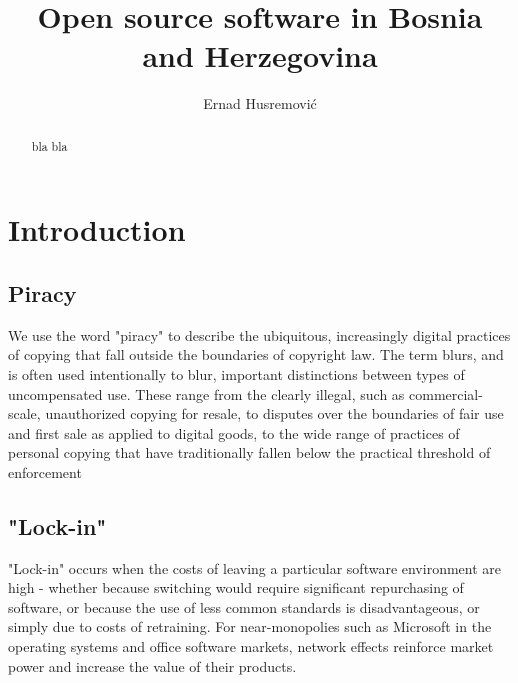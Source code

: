 \documentclass[times, utf8, seminar]{fit}
\begin{document}
\title{Open source software in Bosnia and Herzegovina}

\author{Ernad Husremović}


\maketitle

\tableofcontents

\listoftables
\listoffigures

\begin{abstract}

bla bla 

\end{abstract}


\chapter{Introduction}

\section{Piracy}

We use the word "piracy" to describe the ubiquitous, increasingly digital practices of copying that fall outside the boundaries of copyright law. The term blurs, and is often used intentionally to blur, important distinctions between types of uncompensated use. These range from the clearly illegal, such as commercial-scale, unauthorized copying for resale, to disputes over the boundaries of fair use and first sale as applied to digital goods, to the wide range of practices of personal copying that have traditionally fallen below the practical threshold of enforcement\citep{mediapiracy}


\section{"Lock-in"}

"Lock-in" occurs when the costs of leaving a particular software environment are high - whether because switching would require significant repurchasing of software, or because the use of less common standards is disadvantageous, or simply due to costs of retraining. For near-monopolies such as Microsoft in the operating systems and office software markets, network effects reinforce market power and increase the value of their products.
\end{document}
